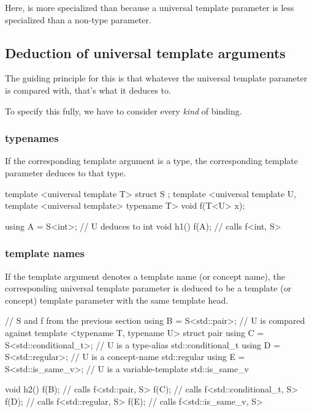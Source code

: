 \documentclass{wg21}
\begin{document}
Here,  is more specialized than  because a universal template parameter is less specialized than a non-type parameter.

\subsection{Deduction of universal template arguments}

The guiding principle for this is that whatever the universal template parameter is compared with, that's what it deduces to.

To specify this fully, we have to consider every \emph{kind} of binding.

\subsubsection{typenames}

If the corresponding template argument is a type, the corresponding template parameter deduces to that type.

\begin{colorblock}
template <universal template T>
struct S {};
template <universal template U, template <universal template> typename T>
void f(T<U> x);

using A = S<int>; // U deduces to int
void h1() {
  f(A{}); // calls f<int, S>
}
\end{colorblock}

\subsubsection{template names}

If the template argument denotes a template name (or concept name), the corresponding universal template parameter
is deduced to be a template (or concept) template parameter with the same template head.

\begin{colorblock}
// S and f from the previous section
using B = S<std::pair>; // U is compared against template <typename T, typename U> struct pair
using C = S<std::conditional_t>; // U is a type-alias std::conditional_t
using D = S<std::regular>; // U is a concept-name std::regular
using E = S<std::is_same_v>; // U is a variable-template std::is_same_v

void h2() {
  f(B{}); // calls f<std::pair, S>
  f(C{}); // calls f<std::conditional_t, S>
  f(D{}); // calls f<std::regular, S>
  f(E{}); // calls f<std::is_same_v, S>
}
\end{colorblock}
\end{document}
